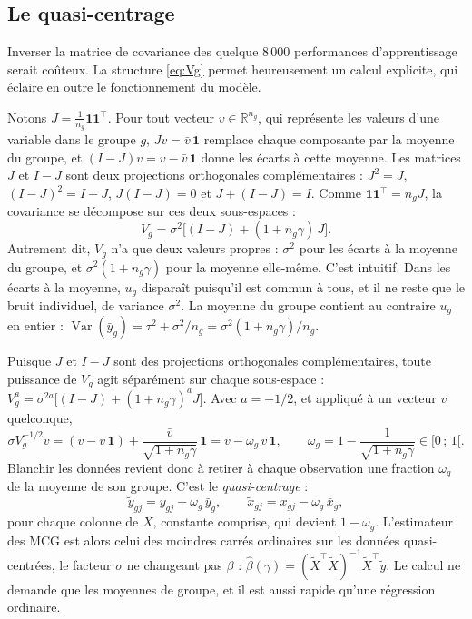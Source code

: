 \documentclass[11pt,a4paper]{article}
\DeclareMathOperator{\Var}{Var}
\begin{document}
\subsection{Le quasi-centrage}\label{sec:quasi_centrage}

Inverser la matrice de covariance des quelque 8\,000 performances d'apprentissage serait coûteux. La structure
\eqref{eq:Vg} permet heureusement un calcul explicite, qui éclaire en outre le fonctionnement du modèle.

Notons $J = \frac{1}{n_g}\mathbf 1\mathbf 1^\top$. Pour tout vecteur $v \in \mathbb{R}^{n_g}$, qui représente les
valeurs d'une variable dans le groupe $g$, $Jv = \bar v\,\mathbf 1$ remplace chaque composante par la moyenne du
groupe, et $(I - J)v = v - \bar v\,\mathbf 1$ donne les écarts à cette moyenne. Les matrices $J$ et $I - J$ sont deux
projections orthogonales complémentaires : $J^2 = J$, $(I-J)^2 = I - J$, $J(I-J) = 0$ et $J + (I - J) = I$. Comme
$\mathbf 1\mathbf 1^\top = n_g J$, la covariance se décompose sur ces deux sous-espaces :
\[
V_g = \sigma^2\big[(I - J) + (1 + n_g\gamma)\,J\big].
\]
Autrement dit, $V_g$ n'a que deux valeurs propres : $\sigma^2$ pour les écarts à la moyenne du groupe, et
$\sigma^2(1 + n_g\gamma)$ pour la moyenne elle-même. C'est intuitif. Dans les écarts à la moyenne, $u_g$ disparaît
puisqu'il est commun à tous, et il ne reste que le bruit individuel, de variance $\sigma^2$. La moyenne du groupe
contient au contraire $u_g$ en entier : $\Var(\bar y_g) = \tau^2 + \sigma^2/n_g = \sigma^2(1 + n_g\gamma)/n_g$.

Puisque $J$ et $I - J$ sont des projections orthogonales complémentaires, toute puissance de $V_g$ agit séparément
sur chaque sous-espace : $V_g^{a} = \sigma^{2a}\big[(I - J) + (1 + n_g\gamma)^a J\big]$. Avec $a = -1/2$, et appliqué à
un vecteur $v$ quelconque,
\[
\sigma V_g^{-1/2} v = (v - \bar v\,\mathbf 1) + \frac{\bar v}{\sqrt{1 + n_g\gamma}}\,\mathbf 1
= v - \omega_g\,\bar v\,\mathbf 1, \qquad \omega_g = 1 - \frac{1}{\sqrt{1 + n_g\gamma}} \in [0\,;\,1[ .
\]
Blanchir les données revient donc à retirer à chaque observation une fraction $\omega_g$ de la moyenne de son groupe.
C'est le \emph{quasi-centrage} :
\begin{equation}\label{eq:quasi_centrage}
\tilde y_{gj} = y_{gj} - \omega_g\,\bar y_g, \qquad \tilde x_{gj} = x_{gj} - \omega_g\,\bar x_g,
\end{equation}
pour chaque colonne de $X$, constante comprise, qui devient $1 - \omega_g$. L'estimateur des MCG est alors celui des
moindres carrés ordinaires sur les données quasi-centrées, le facteur $\sigma$ ne changeant pas $\beta$ :
$\hat\beta(\gamma) = (\tilde X^\top \tilde X)^{-1}\tilde X^\top\tilde y$. Le calcul ne demande que les moyennes de
groupe, et il est aussi rapide qu'une régression ordinaire.
\end{document}
